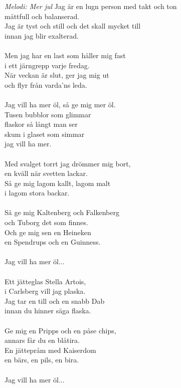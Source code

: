 {\footnotesize\textit{Melodi: Mer jul}}
\vspace{10pt}
Jag är en lugn person med takt och ton\\
måttfull och balanserad.\\
Jag är tyst och still och det skall mycket till\\
innan jag blir exalterad.\\
\\
Men jag har en last som håller mig fast\\
i ett järngrepp varje fredag.\\
När veckan är slut, ger jag mig ut\\
och flyr från varda’ns leda.\\
\\
\revrpt Jag vill ha mer öl, så ge mig mer öl. \rpt\\
Tusen bubblor som glimmar\\
flaskor så långt man ser\\
skum i glaset som simmar\\
jag vill ha mer.\\
\\
Med svalget torrt jag drömmer mig bort,\\
en kväll när svetten lackar.\\
Så ge mig lagom kallt, lagom malt\\
i lagom stora backar.\\
\\
Så ge mig Kaltenberg och Falkenberg\\
och Tuborg det som finnes.\\
Och ge mig sen en Heineken\\
en Spendrups och en Guinness.\\
\\
Jag vill ha mer öl...\\
\\
Ett jätteglas Stella Artois,\\
i Carlsberg vill jag plaska.\\
Jag tar en till och en snabb Dab\\
innan du hinner säga flaska.\\
\\
Ge mig en Pripps och en påse chips,\\
annars får du en blåtira.\\
En jättepråm med Kaiserdom\\
en bärs, en pils, en bira.\\
\\
Jag vill ha mer öl...

